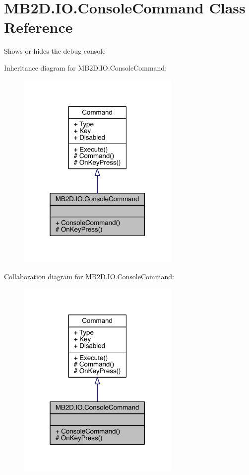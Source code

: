 \hypertarget{class_m_b2_d_1_1_i_o_1_1_console_command}{}\section{M\+B2\+D.\+I\+O.\+Console\+Command Class Reference}
\label{class_m_b2_d_1_1_i_o_1_1_console_command}


Shows or hides the debug console  




Inheritance diagram for M\+B2\+D.\+I\+O.\+Console\+Command\+:\nopagebreak
\begin{figure}[H]
\begin{center}
\leavevmode
\includegraphics[width=223pt]{class_m_b2_d_1_1_i_o_1_1_console_command__inherit__graph}
\end{center}
\end{figure}


Collaboration diagram for M\+B2\+D.\+I\+O.\+Console\+Command\+:\nopagebreak
\begin{figure}[H]
\begin{center}
\leavevmode
\includegraphics[width=223pt]{class_m_b2_d_1_1_i_o_1_1_console_command__coll__graph}
\end{center}
\end{figure}
